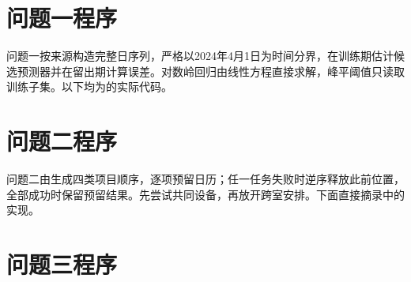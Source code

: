 





\section{问题一程序}

问题一按来源构造完整日序列，严格以2024年4月1日为时间分界，在训练期估计候选预测器并在留出期计算误差。对数岭回归由线性方程直接求解，峰平阈值只读取训练子集。以下均为的实际代码。





\section{问题二程序}

问题二由生成四类项目顺序，逐项预留日历；任一任务失败时逆序释放此前位置，全部成功时保留预留结果。先尝试共同设备，再放开跨室安排。下面直接摘录中的实现。





\section{问题三程序}

